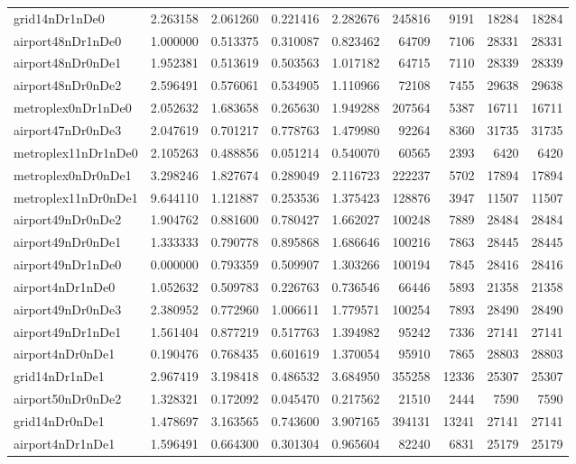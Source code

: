 \documentclass[../../../thesis.tex]{subfiles}
\begin{document}
\begin{longtable}{|l|r|r|r|r|r|r|r|r|}
grid14nDr1nDe0 & 2.263158 & 2.061260 & 0.221416 & 2.282676 & 245816 & 9191 & 18284 & 18284 \\
airport48nDr1nDe0 & 1.000000 & 0.513375 & 0.310087 & 0.823462 & 64709 & 7106 & 28331 & 28331 \\
airport48nDr0nDe1 & 1.952381 & 0.513619 & 0.503563 & 1.017182 & 64715 & 7110 & 28339 & 28339 \\
airport48nDr0nDe2 & 2.596491 & 0.576061 & 0.534905 & 1.110966 & 72108 & 7455 & 29638 & 29638 \\
metroplex0nDr1nDe0 & 2.052632 & 1.683658 & 0.265630 & 1.949288 & 207564 & 5387 & 16711 & 16711 \\
airport47nDr0nDe3 & 2.047619 & 0.701217 & 0.778763 & 1.479980 & 92264 & 8360 & 31735 & 31735 \\
metroplex11nDr1nDe0 & 2.105263 & 0.488856 & 0.051214 & 0.540070 & 60565 & 2393 & 6420 & 6420 \\
metroplex0nDr0nDe1 & 3.298246 & 1.827674 & 0.289049 & 2.116723 & 222237 & 5702 & 17894 & 17894 \\
metroplex11nDr0nDe1 & 9.644110 & 1.121887 & 0.253536 & 1.375423 & 128876 & 3947 & 11507 & 11507 \\
airport49nDr0nDe2 & 1.904762 & 0.881600 & 0.780427 & 1.662027 & 100248 & 7889 & 28484 & 28484 \\
airport49nDr0nDe1 & 1.333333 & 0.790778 & 0.895868 & 1.686646 & 100216 & 7863 & 28445 & 28445 \\
airport49nDr1nDe0 & 0.000000 & 0.793359 & 0.509907 & 1.303266 & 100194 & 7845 & 28416 & 28416 \\
airport4nDr1nDe0 & 1.052632 & 0.509783 & 0.226763 & 0.736546 & 66446 & 5893 & 21358 & 21358 \\
airport49nDr0nDe3 & 2.380952 & 0.772960 & 1.006611 & 1.779571 & 100254 & 7893 & 28490 & 28490 \\
airport49nDr1nDe1 & 1.561404 & 0.877219 & 0.517763 & 1.394982 & 95242 & 7336 & 27141 & 27141 \\
airport4nDr0nDe1 & 0.190476 & 0.768435 & 0.601619 & 1.370054 & 95910 & 7865 & 28803 & 28803 \\
grid14nDr1nDe1 & 2.967419 & 3.198418 & 0.486532 & 3.684950 & 355258 & 12336 & 25307 & 25307 \\
airport50nDr0nDe2 & 1.328321 & 0.172092 & 0.045470 & 0.217562 & 21510 & 2444 & 7590 & 7590 \\
grid14nDr0nDe1 & 1.478697 & 3.163565 & 0.743600 & 3.907165 & 394131 & 13241 & 27141 & 27141 \\
airport4nDr1nDe1 & 1.596491 & 0.664300 & 0.301304 & 0.965604 & 82240 & 6831 & 25179 & 25179 \\

\end{longtable}
\end{document}

